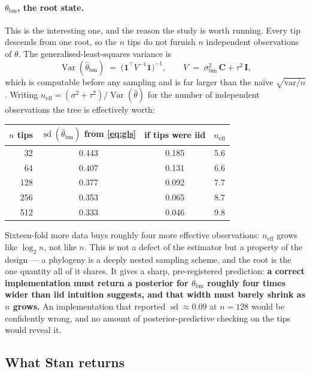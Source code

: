 \documentclass[11pt]{article}
\newcommand{\Cm}{\mathbf{C}}
\newcommand{\Idm}{\mathbf{I}}
\newcommand{\one}{\mathbf{1}}
\begin{document}
\paragraph{$\theta_{\mathrm{bm}}$, the root state.} This is the interesting one, and the reason the
study is worth running. Every tip descends from one root, so the $n$ tips do not furnish $n$
independent observations of $\theta$. The generalised-least-squares variance is
\begin{equation}
\operatorname{Var}(\hat\theta_{\mathrm{bm}}) \;=\; \bigl(\one^{\!\top} V^{-1} \one\bigr)^{-1},
\qquad V \;=\; \sigma_{\mathrm{bm}}^{2}\,\Cm + \tau^{2}\,\Idm,
\label{eq:gls}
\end{equation}
which is computable before any sampling and is far larger than the na\"ive $\sqrt{\mathrm{var}/n}$.
Writing $n_{\mathrm{eff}} = (\sigma^{2} + \tau^{2}) / \operatorname{Var}(\hat\theta)$ for the number
of independent observations the tree is effectively worth:

\begin{center}
\begin{tabular}{@{}rccc@{}}
\toprule
$n$ tips & $\operatorname{sd}(\hat\theta_{\mathrm{bm}})$ from \eqref{eq:gls} & if tips were iid & $n_{\mathrm{eff}}$ \\
\midrule
 32 & 0.443 & 0.185 & 5.6 \\
 64 & 0.407 & 0.131 & 6.6 \\
128 & 0.377 & 0.092 & 7.7 \\
256 & 0.353 & 0.065 & 8.7 \\
512 & 0.333 & 0.046 & 9.8 \\
\bottomrule
\end{tabular}
\end{center}

\noindent
Sixteen-fold more data buys roughly four more effective observations: $n_{\mathrm{eff}}$ grows like
$\log_2 n$, not like $n$. This is not a defect of the estimator but a property of the design ---
a phylogeny is a deeply nested sampling scheme, and the root is the one quantity all of it shares.
It gives a sharp, pre-registered prediction: \textbf{a correct implementation must return a posterior
for $\theta_{\mathrm{bm}}$ roughly four times wider than iid intuition suggests, and that width must
barely shrink as $n$ grows.} An implementation that reported $\operatorname{sd} \approx 0.09$ at
$n = 128$ would be confidently wrong, and no amount of posterior-predictive checking on the tips
would reveal it.

\subsection*{What Stan returns}
\end{document}
